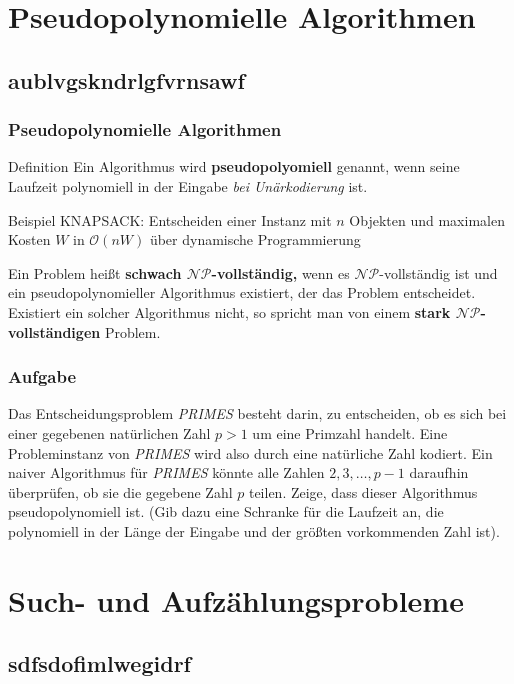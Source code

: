 \section{Pseudopolynomielle Algorithmen}
\subsection{aublvgskndrlgfvrnsawf}
\begin{frame}
\frametitle{Pseudopolynomielle Algorithmen}
\begin{block}{Definition}
Ein Algorithmus wird \textbf{pseudopolyomiell} genannt, wenn seine Laufzeit polynomiell in der Eingabe \textit{bei Unärkodierung} ist.
\end{block}

Beispiel KNAPSACK: Entscheiden einer Instanz mit $n$ Objekten und maximalen Kosten $W$ in $\mathcal O (nW)$ über dynamische Programmierung \micropause

Ein Problem heißt \textbf{schwach $\mathcal{NP}$-vollständig,} wenn es $\mathcal{NP}$-vollständig ist und ein pseudopolynomieller Algorithmus existiert, der das Problem entscheidet.\micropause
Existiert ein solcher Algorithmus nicht, so spricht man von einem \textbf{stark $\mathcal{NP}$-vollständigen} Problem.
\end{frame}

\begin{frame}
\frametitle{Aufgabe}
Das Entscheidungsproblem \textit{PRIMES} besteht darin, zu entscheiden, ob es sich bei einer gegebenen natürlichen Zahl $p>1$ um eine Primzahl handelt. 
Eine Probleminstanz von \textit{PRIMES} wird also durch eine natürliche Zahl kodiert.  \micropause
Ein naiver Algorithmus für \textit{PRIMES} könnte alle Zahlen $2,3,\ldots,p-1$ daraufhin überprüfen, ob sie die gegebene Zahl $p$ teilen.  \micropause
Zeige, dass dieser Algorithmus pseudopolynomiell ist. 
(Gib dazu eine Schranke für die Laufzeit an, die polynomiell in der Länge der Eingabe und der größten vorkommenden Zahl ist).
\end{frame}

\section{Such- und Aufzählungsprobleme}
\subsection{sdfsdofimlwegidrf}
